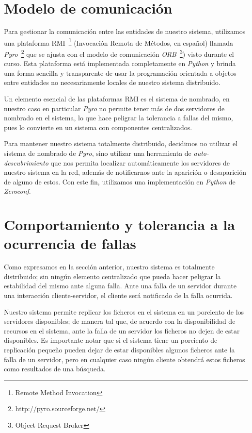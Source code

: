 \documentclass{article}
\begin{document}
\section{Modelo de comunicación}

Para gestionar la comunicación entre las entidades de nuestro sistema,
utilizamos una plataforma RMI~\footnote{Remote Method Invocation} (Invocación 
Remota de Métodos, en español) llamada 
\emph{Pyro}~\footnote{http://pyro.sourceforge.net/} que se ajusta con el modelo 
de comunicación \emph{ORB}~\footnote{Object Request Broker}) visto durante el 
curso. Esta plataforma está implementada completamente en \emph{Python} y brinda 
una forma sencilla y transparente de usar la programación orientada a objetos 
entre entidades no necesariamente locales de nuestro sistema distribuido.

Un elemento esencial de las plataformas RMI es el sistema de nombrado, en nuestro 
caso en particular \emph{Pyro} no permite tener más de dos servidores de nombrado 
en el sistema, lo que hace peligrar la tolerancia a fallas del mismo, pues lo 
convierte en un sistema con componentes centralizados. 

Para mantener nuestro sistema totalmente distribuido, decidimos no utilizar el 
sistema de nombrado de \emph{Pyro}, sino utilizar una herramienta de 
\emph{auto-descubrimiento} que nos permita localizar automáticamente los 
servidores de nuestro sistema en la red, además de notificarnos ante la 
aparición o desaparición de alguno de estos. Con este fin, utilizamos una 
implementación en \emph{Python} de \emph{Zeroconf}.

\section{Comportamiento y tolerancia a la ocurrencia de fallas}

Como expresamos en la sección anterior, nuestro sistema es totalmente
distribuido; sin ningún elemento centralizado que pueda hacer peligrar la
estabilidad del mismo ante alguna falla. Ante una falla de un servidor durante
una interacción cliente-servidor, el cliente será notificado de la falla
ocurrida.

Nuestro sistema permite replicar los ficheros en el sistema en un porciento de 
los servidores disponibles; de manera tal que, de acuerdo con la disponibilidad 
de recursos en el sistema, ante la falla de un servidor los ficheros no dejen de 
estar disponibles. Es importante notar que si el sistema tiene un porciento de 
replicación pequeño pueden dejar de estar disponibles algunos ficheros ante la 
falla de un servidor, pero en cualquier caso ningún cliente obtendrá estos 
ficheros como resultados de una búsqueda.
\end{document}
